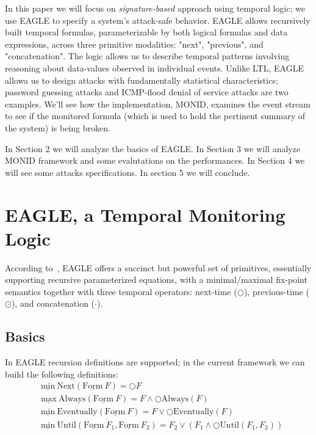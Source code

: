 \documentclass[english]{article}
\begin{document}
In this paper we will focus on \textit{signature-based} approach using temporal logic; we use EAGLE\cite{barringer2004rule,barringer2003eagle} to specify a system's attack-safe behavior. EAGLE allows recursively built temporal formulas, parameterizable by both logical formulas and data expressions, across three primitive modalities: "next", "previous", and "concatenation". The logic allows us to describe temporal patterns involving reasoning about data-values observed in individual events. Unlike LTL, EAGLE allowa us to design attacks with fundamentally statistical characteristics; password guessing attacks and ICMP-flood denial of service attacks are two examples. 
We'll see how the implementation, MONID, examines the event stream to see if the monitored formula (which is used to hold the pertinent summary of the system) is being broken.

In Section 2 we will analyze the basics of EAGLE. In Section 3 we will analyze MONID framework and some evalutations on the performances. In Section 4 we will see some attacks specifications. In section 5 we will conclude.

\section{EAGLE, a Temporal Monitoring Logic}
According to~\cite{barringer2004program}, EAGLE offers a succinct but powerful set of primitives, essentially supporting recursive parameterized equations, with a minimal/maximal fix-point semantics together with three temporal operators: next-time ($\bigcirc$), previous-time ($\odot$), and concatenation ($\cdot$).
\subsection{Basics}
In EAGLE recursion definitions are supported; in the current framework we can build the following definitions:
\begin{align*}
& \underline{\text{min}}\ \text{Next}(\underline{\text{Form}}\ F) = \bigcirc F \\
& \underline{\text{max}}\ \text{Always}(\underline{\text{Form}}\ F) = F \land \bigcirc \text{Always}(F) \\
& \underline{\text{min}}\ \text{Eventually}(\underline{\text{Form}}\ F) = F \lor \bigcirc \text{Eventually}(F) \\
& \underline{\text{min}}\ \text{Until}(\underline{\text{Form}}\ F_1, \underline{\text{Form}}\ F_2) = F_2 \lor (F_1 \land \bigcirc \text{Until}(F_1,F_2))
\end{align*}
\end{document}
